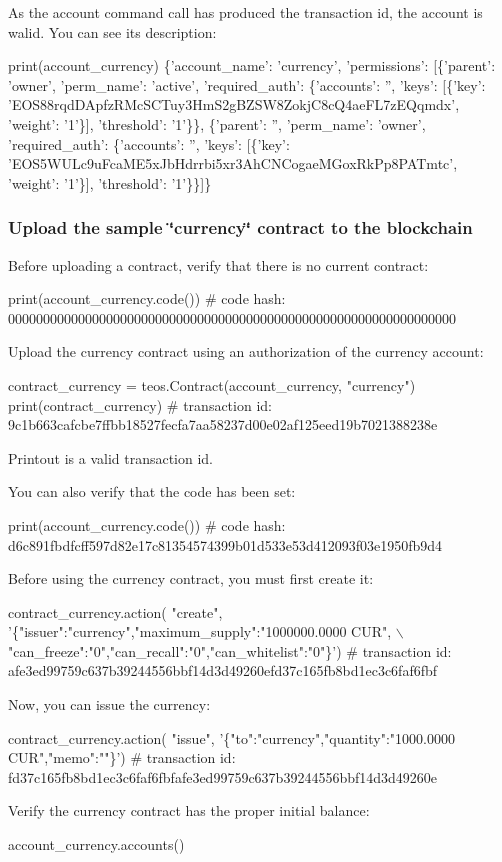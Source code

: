 As the account command call has produced the transaction id, the account is walid. You can see its description\+: 
\begin{DoxyCode}
print(account\_currency)
\{'account\_name': 'currency',
 'permissions': [\{'parent': 'owner',
                  'perm\_name': 'active',
                  'required\_auth': \{'accounts': '',
                                    'keys': [\{'key':
       'EOS88rqdDApfzRMcSCTuy3HmS2gBZSW8ZokjC8cQ4aeFL7zEQqmdx',
                                              'weight': '1'\}],
                                    'threshold': '1'\}\},
                 \{'parent': '',
                  'perm\_name': 'owner',
                  'required\_auth': \{'accounts': '',
                                    'keys': [\{'key':
       'EOS5WULc9uFcaME5xJbHdrrbi5xr3AhCNCogaeMGoxRkPp8PATmtc',
                                              'weight': '1'\}],
                                    'threshold': '1'\}\}]\}
\end{DoxyCode}
 \subsubsection*{Upload the sample \char`\"{}currency\char`\"{} contract to the blockchain}

Before uploading a contract, verify that there is no current contract\+: 
\begin{DoxyCode}
print(account\_currency.code())
#             code hash: 0000000000000000000000000000000000000000000000000000000000000000
\end{DoxyCode}
 Upload the currency contract using an authorization of the currency account\+: 
\begin{DoxyCode}
contract\_currency = teos.Contract(account\_currency, "currency")
print(contract\_currency)
#        transaction id: 9c1b663cafcbe7ffbb18527fecfa7aa58237d00e02af125eed19b7021388238e
\end{DoxyCode}
 Printout is a valid transaction id.

You can also verify that the code has been set\+: 
\begin{DoxyCode}
print(account\_currency.code())
#             code hash: d6c891fbdfcff597d82e17c81354574399b01d533e53d412093f03e1950fb9d4
\end{DoxyCode}
 Before using the currency contract, you must first create it\+: 
\begin{DoxyCode}
contract\_currency.action(
  "create", 
  '\{"issuer":"currency","maximum\_supply":"1000000.0000 CUR", \(\backslash\)
  "can\_freeze":"0","can\_recall":"0","can\_whitelist":"0"\}')
#        transaction id: afe3ed99759c637b39244556bbf14d3d49260efd37c165fb8bd1ec3c6faf6fbf
\end{DoxyCode}
 Now, you can issue the currency\+: 
\begin{DoxyCode}
contract\_currency.action(
  "issue", 
  '\{"to":"currency","quantity":"1000.0000 CUR","memo":""\}')
#        transaction id: fd37c165fb8bd1ec3c6faf6fbfafe3ed99759c637b39244556bbf14d3d49260e
\end{DoxyCode}
 Verify the currency contract has the proper initial balance\+: 
\begin{DoxyCode}
account\_currency.accounts()
\end{DoxyCode}
